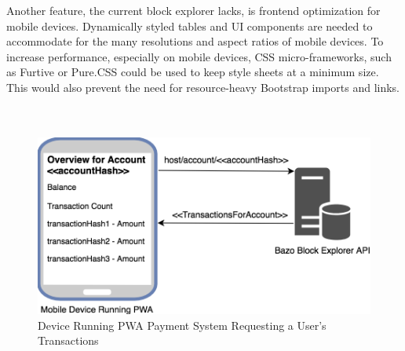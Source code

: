 Another feature, the current block explorer lacks, is frontend optimization for mobile devices. Dynamically styled tables and UI components are needed to accommodate for the many resolutions and aspect ratios of mobile devices. To increase performance, especially on mobile devices, CSS micro-frameworks, such as Furtive \cite{furtive} or Pure.CSS \cite{pure} could be used to keep style sheets at a minimum size. This would also prevent the need for resource-heavy Bootstrap imports and links.
\\
\\
\\

\begin{figure}[h]
  \includegraphics[scale=0.4]{pwa_integration.png}
  \centering
  \caption{Device Running PWA Payment System Requesting a User's Transactions}
  \label{fig:pwa_api}
\end{figure}